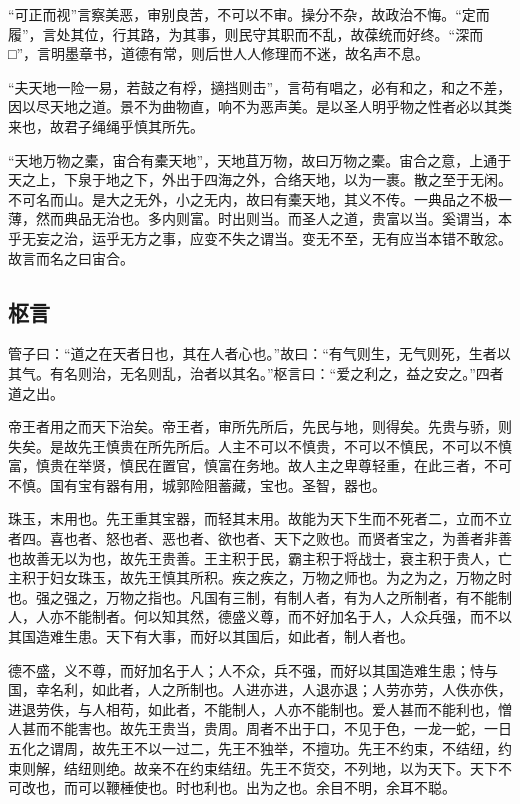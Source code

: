 \documentclass[]{article}
\begin{document}
``可正而视''言察美恶，审别良苦，不可以不审。操分不杂，故政治不悔。``定而履''，言处其位，行其路，为其事，则民守其职而不乱，故葆统而好终。``深而□''，言明墨章书，道德有常，则后世人人修理而不迷，故名声不息。

``夫天地一险一易，若鼓之有桴，擿挡则击''，言苟有唱之，必有和之，和之不差，因以尽天地之道。景不为曲物直，响不为恶声美。是以圣人明乎物之性者必以其类来也，故君子绳绳乎慎其所先。

``天地万物之橐，宙合有橐天地''，天地苴万物，故曰万物之橐。宙合之意，上通于天之上，下泉于地之下，外出于四海之外，合络天地，以为一裹。散之至于无闲。不可名而山。是大之无外，小之无内，故曰有橐天地，其义不传。一典品之不极一薄，然而典品无治也。多内则富。时出则当。而圣人之道，贵富以当。奚谓当，本乎无妄之治，运乎无方之事，应变不失之谓当。变无不至，无有应当本错不敢忿。故言而名之曰宙合。

\hypertarget{header-n222}{%
\subsection{枢言}\label{header-n222}}

管子曰：``道之在天者日也，其在人者心也。''故曰：``有气则生，无气则死，生者以其气。有名则治，无名则乱，治者以其名。''枢言曰：``爱之利之，益之安之。''四者道之出。

帝王者用之而天下治矣。帝王者，审所先所后，先民与地，则得矣。先贵与骄，则失矣。是故先王慎贵在所先所后。人主不可以不慎贵，不可以不慎民，不可以不慎富，慎贵在举贤，慎民在置官，慎富在务地。故人主之卑尊轻重，在此三者，不可不慎。国有宝有器有用，城郭险阻蓄藏，宝也。圣智，器也。

珠玉，末用也。先王重其宝器，而轻其末用。故能为天下生而不死者二，立而不立者四。喜也者、怒也者、恶也者、欲也者、天下之败也。而贤者宝之，为善者非善也故善无以为也，故先王贵善。王主积于民，霸主积于将战士，衰主积于贵人，亡主积于妇女珠玉，故先王慎其所积。疾之疾之，万物之师也。为之为之，万物之时也。强之强之，万物之指也。凡国有三制，有制人者，有为人之所制者，有不能制人，人亦不能制者。何以知其然，德盛义尊，而不好加名于人，人众兵强，而不以其国造难生患。天下有大事，而好以其国后，如此者，制人者也。

德不盛，义不尊，而好加名于人；人不众，兵不强，而好以其国造难生患；恃与国，幸名利，如此者，人之所制也。人进亦进，人退亦退；人劳亦劳，人佚亦佚，进退劳佚，与人相苟，如此者，不能制人，人亦不能制也。爱人甚而不能利也，憎人甚而不能害也。故先王贵当，贵周。周者不出于口，不见于色，一龙一蛇，一日五化之谓周，故先王不以一过二，先王不独举，不擅功。先王不约束，不结纽，约束则解，结纽则绝。故亲不在约束结纽。先王不货交，不列地，以为天下。天下不可改也，而可以鞭棰使也。时也利也。出为之也。余目不明，余耳不聪。
\end{document}

